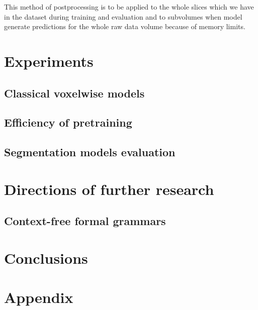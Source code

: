 \documentclass[twocolumn, a4paper]{article}
\theoremstyle{definition}
\begin{document}
This method of postprocessing is to be applied to the whole slices which we have in the dataset during training and
evaluation and to subvolumes when model generate predictions for the whole raw data volume because of memory limits.

\section{Experiments}

\subsection{Classical voxelwise models} \label{sec:voxelwise_expr}

\subsection{Efficiency of pretraining}

\subsection{Segmentation models evaluation}

\section{Directions of further research}
\subsection{Context-free formal grammars}

\section{Conclusions}




\onecolumn
\section*{Appendix} \label{sec:appendix}
\end{document}
